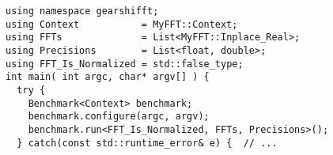 \begin{lstlisting}[caption={Using FFT client types to run the benchmarks},label={lst:implfftusingp2}]
using namespace gearshifft;
using Context           = MyFFT::Context;         
using FFTs              = List<MyFFT::Inplace_Real>;
using Precisions        = List<float, double>;   
using FFT_Is_Normalized = std::false_type;
int main( int argc, char* argv[] ) {                                                        
  try {                                                  
    Benchmark<Context> benchmark;
    benchmark.configure(argc, argv);                     
    benchmark.run<FFT_Is_Normalized, FFTs, Precisions>();
  } catch(const std::runtime_error& e) {  // ...
\end{lstlisting}

\begin{figure}[t]
\centering
\newcommand{\pclass}[5][]{
\ifthenelse { \equal {#1} {} }
 {\node[class] (#5) at (#3,#4) {#2};}
 {\node[class] (#5) at (#3,#4) {%
\begin{tabular}{c}\scriptsize{<<#1>>}\\#2\end{tabular}%
};}
}
\end{figure}
